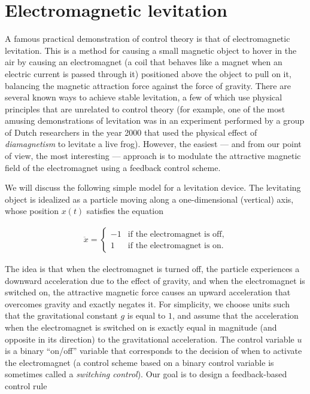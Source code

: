 \documentclass[11pt]{report}
\theoremstyle{plain}
\theoremstyle{definition}
\begin{document}
\section{Electromagnetic levitation}
A famous practical demonstration of control theory is
that of electromagnetic levitation. This is a method
for causing a small magnetic object to hover in the
air by causing an electromagnet (a coil that behaves
like a magnet when an electric current is passed
through it) positioned above the object to pull on it,
balancing the magnetic attraction force against the
force of gravity. There are several known ways to
achieve stable levitation, a few of which use physical
principles that are unrelated to control theory (for
example, one of the most amusing demonstrations of
levitation was in an experiment performed by a group
of Dutch researchers in the year 2000 that used the
physical effect of \emph{diamagnetism} to levitate a live
frog). However, the easiest --- and from our point of
view, the most interesting --- approach is to modulate
the attractive magnetic field of the electromagnet
using a feedback control scheme.

We will discuss the following simple model for a
levitation device. The levitating object is idealized
as a particle moving along a one-dimensional
(vertical) axis, whose position $x(t)$ satisfies the
equation

\begin{align*}
\ddot{x} = \begin{cases} -1 & \textrm{if the electromagnet is off}, \\
1 & \textrm{if the electromagnet is on.}
\end{cases}
\end{align*}

The idea is that when the electromagnet is turned
off, the particle experiences a downward acceleration
due to the effect of gravity, and when the
electromagnet is switched on, the attractive magnetic
force causes an upward acceleration that overcomes
gravity and exactly negates it. For simplicity, we
choose units such that the gravitational constant $g$
is equal to $1$, and assume that the acceleration
when the electromagnet is switched on is exactly equal
in magnitude (and opposite in its direction) to the
gravitational acceleration. The control variable $u$
is a binary ``on/off'' variable that corresponds to
the decision of when to activate the electromagnet (a
control scheme based on a binary control variable is
sometimes called a \emph{switching control}). Our goal is
to design a feedback-based control rule
\end{document}
